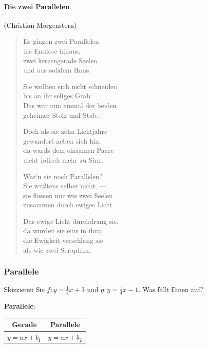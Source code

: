 

\paragraph{Die zwei Parallelen} (Christian Morgenstern)
\begin{verse}
Es gingen zwei Parallelen\\
ins Endlose hinaus,\\
zwei kerzengerade Seelen\\
und aus solidem Haus.

Sie wollten sich nicht schneiden\\
bis an ihr seliges Grab:\\
Das war nun einmal der beiden\\
geheimer Stolz und Stab.

Doch als sie zehn Lichtjahre\\
gewandert neben sich hin,\\
da wards dem einsamen Paare\\
nicht irdisch mehr zu Sinn.

War'n sie noch Parallelen?\\
Sie wußtens selber nicht, ---\\
sie flossen nur wie zwei Seelen\\
zusammen durch ewiges Licht.

Das ewige Licht durchdrang sie,\\
da wurden sie eins in ihm;\\
die Ewigkeit verschlang sie\\
als wie zwei Seraphim.
\end{verse}
\newpage

\subsubsection{Parallele}

Skizzieren Sie $f: y=\frac{1}{4}x +3$ und $g:
y=\frac{1}{4}x -1$. Was fällt Ihnen auf?



\textbf{Parallele}:\\

\begin{center}
\begin{tabular}{c|c}
  Gerade     & Parallele   \\
  \hline
  $y=ax+b_1$ & $y=ax+b_2$ \\
\end{tabular}
\end{center}


